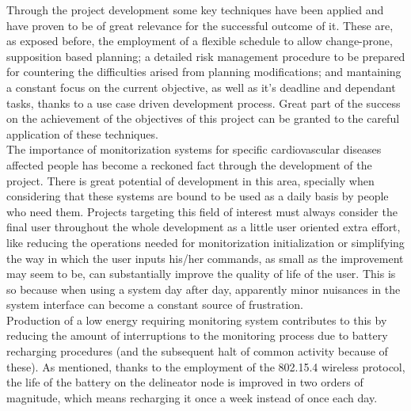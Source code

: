 		Through the project development some key techniques have been applied and have proven to be of great relevance for the successful outcome of it. These are, as exposed before, the employment of a flexible schedule to allow change-prone, supposition based planning; a detailed risk management procedure to be prepared for countering the difficulties arised from planning modifications; and mantaining a constant focus on the current objective, as well as it's deadline and dependant tasks, thanks to a use case driven development process. Great part of the success on the achievement of the objectives of this project can be granted to the careful application of these techniques.\\

		The importance of monitorization systems for specific cardiovascular diseases affected people has become a reckoned fact through the development of the project. There is great potential of development in this area, specially when considering that these systems are bound to be used as a daily basis by people who need them. Projects targeting this field of interest must always consider the final user throughout the whole development as a little user oriented extra effort, like reducing the operations needed for monitorization initialization or simplifying the way in which the user inputs his/her commands, as small as the improvement may seem to be, can substantially improve the quality of life of the user. This is so because when using a system day after day, apparently minor nuisances in the system interface can become a constant source of frustration.\\

		Production of a low energy requiring monitoring system contributes to this by reducing the amount of interruptions to the monitoring process due to battery recharging procedures (and the subsequent halt of common activity because of these). As mentioned, thanks to the employment of the 802.15.4 wireless protocol, the life of the battery on the delineator node is improved in two orders of magnitude, which means recharging it once a week instead of once each day.\\


